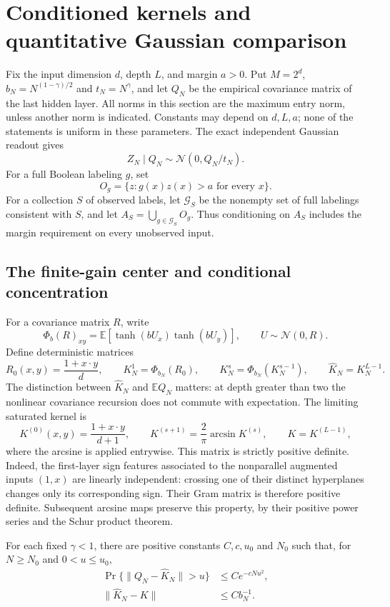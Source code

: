 \section{Conditioned kernels and quantitative Gaussian comparison}
\label{sec:quantitative-comparison}

Fix the input dimension $d$, depth $L$, and margin $a>0$. Put
$M=2^d$, $b_N=N^{(1-\gamma)/2}$ and $t_N=N^\gamma$, and let $Q_N$
be the empirical covariance matrix of the last hidden layer. All norms
in this section are the maximum entry norm, unless another norm is
indicated. Constants may depend on $d,L,a$; none of the statements is
uniform in these parameters. The exact independent Gaussian readout gives
\[
 Z_N\mid Q_N\sim\mathcal N(0,Q_N/t_N).
\]
For a full Boolean labeling $g$, set
\[
 O_g=\{z:g(x)z(x)>a\text{ for every }x\}.
\]
For a collection $S$ of observed labels, let $\mathcal G_S$ be the
nonempty set of full labelings consistent with $S$, and let
$A_S=\bigcup_{g\in\mathcal G_S}O_g$. Thus conditioning on $A_S$
includes the margin requirement on every unobserved input.

\subsection{The finite-gain center and conditional concentration}

For a covariance matrix $R$, write
\[
 \Phi_b(R)_{xy}=\mathbb E[\tanh(bU_x)\tanh(bU_y)],
 \qquad U\sim\mathcal N(0,R).
\]
Define deterministic matrices
\[
 R_0(x,y)=\frac{1+x\cdot y}{d},\qquad
 K_N^1=\Phi_{b_N}(R_0),\qquad
 K_N^s=\Phi_{b_N}(K_N^{s-1}),\qquad
 \widehat K_N=K_N^{L-1}.
\]
The distinction between $\widehat K_N$ and $\mathbb E Q_N$ matters:
at depth greater than two the nonlinear covariance recursion does not
commute with expectation. The limiting saturated kernel is
\[
 K^{(0)}(x,y)=\frac{1+x\cdot y}{d+1},\qquad
 K^{(s+1)}=\frac2\pi\arcsin K^{(s)},\qquad K=K^{(L-1)},
\]
where the arcsine is applied entrywise. This matrix is strictly positive
definite. Indeed, the first-layer sign features associated to the
nonparallel augmented inputs $(1,x)$ are linearly independent: crossing
one of their distinct hyperplanes changes only its corresponding sign.
Their Gram matrix is therefore positive definite. Subsequent arcsine
maps preserve this property, by their positive power series and the
Schur product theorem.

\begin{lemma}
\label{lem:cmp-concentration}
For each fixed $\gamma<1$, there are positive constants $C,c,u_0$ and
$N_0$ such that, for $N\ge N_0$ and $0<u\le u_0$,
\begin{align}
 \Pr\{\|Q_N-\widehat K_N\|>u\}&\le C e^{-cNu^2},
 \label{eq:cmp-finite-concentration}\\
 \|\widehat K_N-K\|&\le C b_N^{-1}.
 \label{eq:cmp-finite-bias}
\end{align}
\end{lemma}

